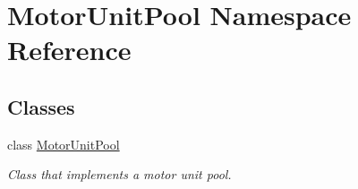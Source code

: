 \hypertarget{namespace_motor_unit_pool}{}\section{Motor\+Unit\+Pool Namespace Reference}
\label{namespace_motor_unit_pool}
\subsection*{Classes}
\begin{DoxyCompactItemize}
\item 
class \hyperlink{class_motor_unit_pool_1_1_motor_unit_pool}{Motor\+Unit\+Pool}
\begin{DoxyCompactList}\small\item\em Class that implements a motor unit pool. \end{DoxyCompactList}\end{DoxyCompactItemize}
